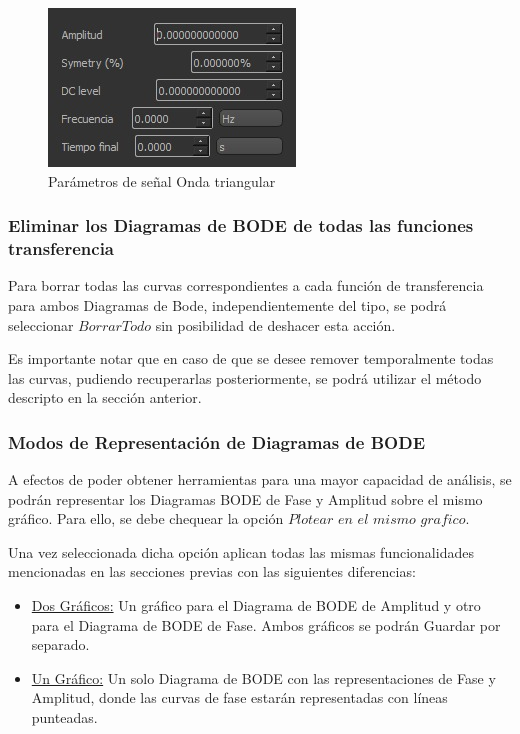 \begin{figure}[!htb] 
    \centering 
    \includegraphics  [scale=0.8]{../EJ2/LatexScreenshots/triangle.png} 
    \caption{Parámetros de señal Onda triangular}
    \label{fig:triangle}
\end{figure}

\subsubsection{Eliminar los Diagramas de BODE de todas las funciones transferencia}

Para borrar todas las curvas correspondientes a cada función de transferencia para ambos Diagramas de Bode, independientemente del tipo, se podrá seleccionar $Borrar Todo$ sin posibilidad de deshacer esta acción. 

Es importante notar que en caso de que se desee remover temporalmente todas las curvas, pudiendo recuperarlas posteriormente, se podrá utilizar el método descripto en la sección anterior.

\subsubsection{Modos de Representación de Diagramas de BODE}

A efectos de poder obtener herramientas para una mayor capacidad de análisis, se podrán representar los Diagramas BODE de Fase y Amplitud sobre el mismo gráfico. 
Para ello, se debe chequear la opción $Plotear$ $en$ $el$ $mismo$ $grafico$.

Una vez seleccionada dicha opción aplican todas las mismas funcionalidades mencionadas en las secciones previas con las siguientes diferencias:

\begin{itemize}
    \item \underline{Dos Gráficos:} Un gráfico para el Diagrama de BODE de Amplitud y otro para el Diagrama de BODE de Fase. Ambos gráficos se podrán Guardar por separado.
    \item \underline{Un Gráfico:} Un solo Diagrama de BODE con las representaciones de Fase y Amplitud, donde las curvas de fase estarán representadas con líneas punteadas.

\end{itemize}


